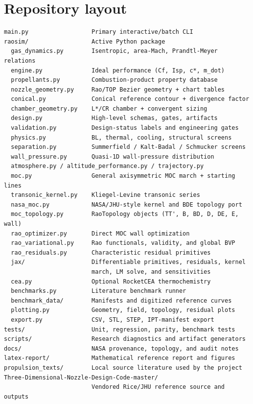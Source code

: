 \documentclass[11pt]{article}
\begin{document}
\section{Repository layout}

\begin{lstlisting}
main.py                  Primary interactive/batch CLI
raosim/                  Active Python package
  gas_dynamics.py        Isentropic, area-Mach, Prandtl-Meyer relations
  engine.py              Ideal performance (Cf, Isp, c*, m_dot)
  propellants.py         Combustion-product property database
  nozzle_geometry.py     Rao/TOP Bezier geometry + chart tables
  conical.py             Conical reference contour + divergence factor
  chamber_geometry.py    L*/CR chamber + convergent sizing
  design.py              High-level schemas, gates, artifacts
  validation.py          Design-status labels and engineering gates
  physics.py             BL, thermal, cooling, structural screens
  separation.py          Summerfield / Kalt-Badal / Schmucker screens
  wall_pressure.py       Quasi-1D wall-pressure distribution
  atmosphere.py / altitude_performance.py / trajectory.py
  moc.py                 General axisymmetric MOC march + starting lines
  transonic_kernel.py    Kliegel-Levine transonic series
  nasa_moc.py            NASA/JHU-style kernel and BDE topology port
  moc_topology.py        RaoTopology objects (TT', B, BD, D, DE, E, wall)
  rao_optimizer.py       Direct MOC wall optimization
  rao_variational.py     Rao functionals, validity, and global BVP
  rao_residuals.py       Characteristic residual primitives
  jax/                   Differentiable primitives, residuals, kernel
                         march, LM solve, and sensitivities
  cea.py                 Optional RocketCEA thermochemistry
  benchmarks.py          Literature benchmark runner
  benchmark_data/        Manifests and digitized reference curves
  plotting.py            Geometry, field, topology, residual plots
  export.py              CSV, STL, STEP, IPT-manifest export
tests/                   Unit, regression, parity, benchmark tests
scripts/                 Research diagnostics and artifact generators
docs/                    NASA provenance, topology, and audit notes
latex-report/            Mathematical reference report and figures
propulsion_texts/        Local source literature used by the project
Three-Dimensional-Nozzle-Design-Code-master/
                         Vendored Rice/JHU reference source and outputs
\end{lstlisting}
\end{document}
